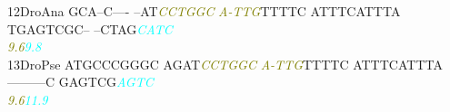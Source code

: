 \documentclass[11pt,twoside,reqno,a4paper]{article}
\begin{document}
{12\hspace*{2\charwidth}DroAna	GCA--C----	--AT\textit{\textcolor{olive}{C}}\textit{\textcolor{olive}{C}}\textit{\textcolor{olive}{T}}\textit{\textcolor{olive}{G}}\textit{\textcolor{olive}{G}}\textit{\textcolor{olive}{C}}	\textit{\textcolor{olive}{A}}\textit{\textcolor{olive}{-}}\textit{\textcolor{olive}{T}}\textit{\textcolor{olive}{T}}\textit{\textcolor{olive}{G}}TTTTC	ATTTCATTTA	TGAGTCGC--	--CTAG\textit{\textcolor{cyan}{C}}\textit{\textcolor{cyan}{A}}\textit{\textcolor{cyan}{T}}\textit{\textcolor{cyan}{C}}	\\
\hspace*{4\charwidth}\hspace*{7\charwidth}\hspace*{1\charwidth}\hspace*{14\charwidth}\textit{\textcolor{olive}{9.6}}\hspace*{1\charwidth}\hspace*{1\charwidth}\hspace*{1\charwidth}\hspace*{1\charwidth}\hspace*{39\charwidth}\textit{\textcolor{cyan}{9.8}}\hspace*{1\charwidth}\\
13\hspace*{2\charwidth}DroPse	ATGCCCGGGC	AGAT\textit{\textcolor{olive}{C}}\textit{\textcolor{olive}{C}}\textit{\textcolor{olive}{T}}\textit{\textcolor{olive}{G}}\textit{\textcolor{olive}{G}}\textit{\textcolor{olive}{C}}	\textit{\textcolor{olive}{A}}\textit{\textcolor{olive}{-}}\textit{\textcolor{olive}{T}}\textit{\textcolor{olive}{T}}\textit{\textcolor{olive}{G}}TTTTC	ATTTCATTTA	---------C	GAGTCG\textit{\textcolor{cyan}{A}}\textit{\textcolor{cyan}{G}}\textit{\textcolor{cyan}{T}}\textit{\textcolor{cyan}{C}}	\\
\hspace*{4\charwidth}\hspace*{7\charwidth}\hspace*{1\charwidth}\hspace*{14\charwidth}\textit{\textcolor{olive}{9.6}}\hspace*{1\charwidth}\hspace*{1\charwidth}\hspace*{1\charwidth}\hspace*{1\charwidth}\hspace*{39\charwidth}\textit{\textcolor{cyan}{11.9}}\hspace*{1\charwidth}\\
}
\end{document}
